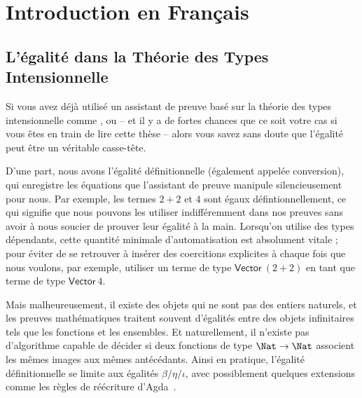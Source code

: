 \setchapterpreamble[u]{\margintoc}
\chapter{Introduction en Français}

\section{L'égalité dans la Théorie des Types Intensionnelle}

Si vous avez déjà utilisé un assistant de preuve basé sur la théorie des types 
intensionnelle comme \Coq, \Agda ou \Lean -- et il y a de fortes chances que 
ce soit votre cas si vous êtes en train de lire cette thèse -- alors vous savez 
sans doute que l'égalité peut être un véritable casse-tête.

D'une part, nous avons l'égalité définitionnelle (également appelée conversion), 
qui enregistre les équations que l'assistant de preuve manipule silencieusement 
pour nous. 
% 
% 
Par exemple, les termes \( 2 + 2 \) et \( 4 \) sont égaux défintionnellement, 
ce qui signifie que nous pouvons les utiliser indifféremment dans nos preuves 
sans avoir à nous soucier de prouver leur égalité à la main. 
% 
Lorsqu'on utilise des types dépendants, cette quantité minimale 
d'automatisation est absolument vitale ; pour éviter de se retrouver à insérer 
des coercitions explicites à chaque fois que nous voulons, par exemple, 
utiliser un terme de type \( \mathsf{Vector}\ (2+2) \) en tant que terme de 
type \( \mathsf{Vector}\ 4 \).

Mais malheureusement, il existe des objets qui ne sont pas des entiers 
naturels, et les preuves mathématiques traitent 
souvent d'égalités entre des objets infinitaires tels que les fonctions et les 
ensembles. 
% 
Et naturellement, il n'existe pas d'algorithme capable de décider si deux 
fonctions de type \( \Nat \to \Nat \) associent les mêmes images aux mêmes 
antécédants.
% 
Ainsi en pratique, l'égalité définitionnelle se limite aux égalités 
\( \beta / \eta / \iota \), avec possiblement quelques extensions comme les 
règles de réécriture d'Agda~.

